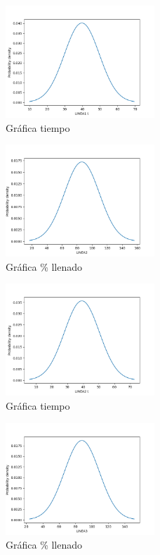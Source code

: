 \documentclass{article}
\begin{document}
\begin{figure}[h!]
\caption{Gráfica tiempo}
\centering
\includegraphics[width=0.5\textwidth]{linea1t.png}
\end{figure}

\begin{figure}[h!]
\caption{Gráfica \% llenado}
\centering
\includegraphics[width=0.5\textwidth]{linea2.png}
\end{figure}

\begin{figure}[h!]
\caption{Gráfica tiempo}
\centering
\includegraphics[width=0.5\textwidth]{linea2t.png}
\end{figure}

\begin{figure}[h!]
\caption{Gráfica \% llenado}  
\centering
\includegraphics[width=0.5\textwidth]{linea3.png}
\end{figure}
\end{document}
